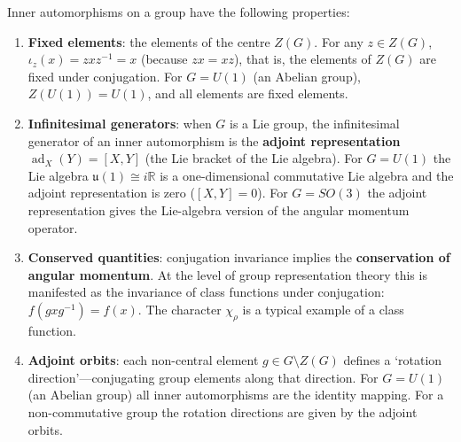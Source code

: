 \begin{proposition}\label{prop:rotation_operator}
Inner automorphisms on a group have the following properties:
\begin{enumerate}[label=(\roman*)]
    \item \textbf{Fixed elements}: the elements of the centre $Z(G)$. For any $z \in Z(G)$, $\iota_z(x) = zxz^{-1} = x$ (because $zx = xz$), that is, the elements of $Z(G)$ are fixed under conjugation. For $G = U(1)$ (an Abelian group), $Z(U(1)) = U(1)$, and all elements are fixed elements.
    \item \textbf{Infinitesimal generators}: when $G$ is a Lie group, the infinitesimal generator of an inner automorphism is the \textbf{adjoint representation} $\operatorname{ad}_X(Y) = [X,Y]$ (the Lie bracket of the Lie algebra). For $G = U(1)$ the Lie algebra $\mathfrak{u}(1) \cong i\mathbb{R}$ is a one-dimensional commutative Lie algebra and the adjoint representation is zero ($[X,Y]=0$). For $G = SO(3)$ the adjoint representation gives the Lie-algebra version of the angular momentum operator.
    \item \textbf{Conserved quantities}: conjugation invariance implies the \textbf{conservation of angular momentum}. At the level of group representation theory this is manifested as the invariance of class functions under conjugation: $f(gxg^{-1}) = f(x)$. The character $\chi_\rho$ is a typical example of a class function.
    \item \textbf{Adjoint orbits}: each non-central element $g \in G \setminus Z(G)$ defines a `rotation direction'---conjugating group elements along that direction. For $G = U(1)$ (an Abelian group) all inner automorphisms are the identity mapping. For a non-commutative group the rotation directions are given by the adjoint orbits.
\end{enumerate}
\end{proposition}

